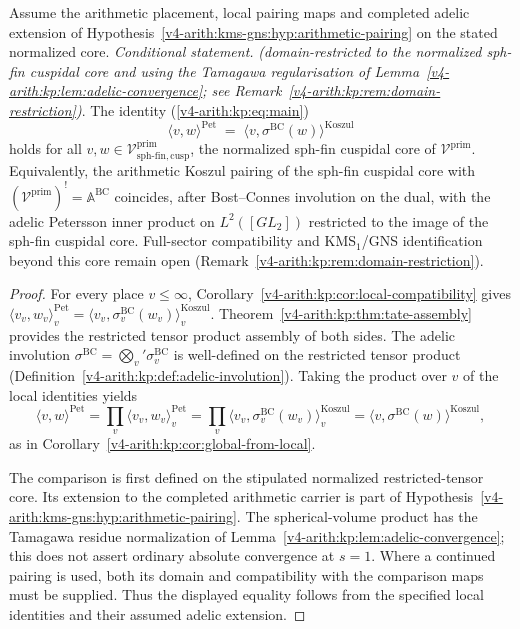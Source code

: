 \begin{theorem}
\label{v4-arith:kp:thm:main-full}
Assume the arithmetic placement, local pairing maps and completed
adelic extension of Hypothesis~\ref{v4-arith:kms-gns:hyp:arithmetic-pairing}
on the stated normalized core.
\emph{Conditional statement.} \emph{(domain-restricted to the normalized
sph-fin cuspidal core and using the Tamagawa regularisation of
Lemma~\ref{v4-arith:kp:lem:adelic-convergence}; see
Remark~\ref{v4-arith:kp:rem:domain-restriction})}. The identity
(\ref{v4-arith:kp:eq:main})
\begin{equation*}
\langle v,w\rangle^{\mathrm{Pet}}
\;=\;
\langle v,\sigma^{\mathrm{BC}}(w)\rangle^{\mathrm{Koszul}}
\end{equation*}
holds for all
\(v,w\in\mathcal{V}^{\mathrm{prim}}_{\mathrm{sph\text{-}fin,cusp}}\),
the normalized sph-fin cuspidal core of \(\mathcal{V}^{\mathrm{prim}}\).
Equivalently, the arithmetic Koszul pairing of the sph-fin
cuspidal core with
\((\mathcal{V}^{\mathrm{prim}})^{!}=\mathbb{A}^{\mathrm{BC}}\)
coincides, after Bost--Connes involution on the dual, with the
adelic Petersson inner product on \(L^{2}([GL_{2}])\) restricted
to the image of the sph-fin cuspidal core. Full-sector
compatibility and KMS\(_{1}\)/GNS identification beyond this core
remain open
(Remark~\ref{v4-arith:kp:rem:domain-restriction}).
\end{theorem}

\begin{proof}
For every place \(v\leq\infty\),
Corollary~\ref{v4-arith:kp:cor:local-compatibility} gives
\(\langle v_{v},w_{v}\rangle^{\mathrm{Pet}}_{v}
=\langle v_{v},\sigma^{\mathrm{BC}}_{v}(w_{v})\rangle^{\mathrm{Koszul}}_{v}\).
Theorem~\ref{v4-arith:kp:thm:tate-assembly} provides the restricted
tensor product assembly of both sides. The adelic involution
\(\sigma^{\mathrm{BC}}=\bigotimes_{v}'\sigma^{\mathrm{BC}}_{v}\)
is well-defined on the restricted tensor product
(Definition~\ref{v4-arith:kp:def:adelic-involution}). Taking the product
over \(v\) of the local identities yields
\begin{equation*}
\langle v,w\rangle^{\mathrm{Pet}}
=\prod_{v}\langle v_{v},w_{v}\rangle^{\mathrm{Pet}}_{v}
=\prod_{v}\langle v_{v},\sigma^{\mathrm{BC}}_{v}(w_{v})\rangle^{\mathrm{Koszul}}_{v}
=\langle v,\sigma^{\mathrm{BC}}(w)\rangle^{\mathrm{Koszul}},
\end{equation*}
as in Corollary~\ref{v4-arith:kp:cor:global-from-local}.

The comparison is first defined on the stipulated normalized
restricted-tensor core. Its extension to the completed arithmetic
carrier is part of Hypothesis~\ref{v4-arith:kms-gns:hyp:arithmetic-pairing}.
The spherical-volume product has the Tamagawa residue normalization
of Lemma~\ref{v4-arith:kp:lem:adelic-convergence}; this does not
assert ordinary absolute convergence at \(s=1\). Where a continued
pairing is used, both its domain and compatibility with the comparison
maps must be supplied. Thus the displayed equality follows from the
specified local identities and their assumed adelic extension.
\end{proof}

